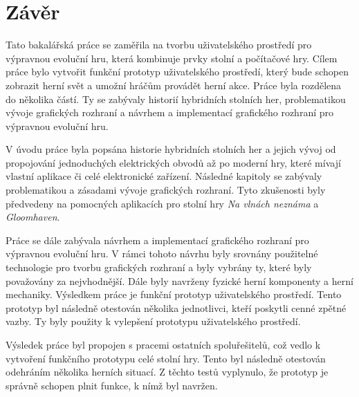 \chapter{Závěr}
Tato bakalářská práce se zaměřila na tvorbu uživatelského prostředí pro výpravnou evoluční hru, která kombinuje prvky stolní a počítačové hry. Cílem práce bylo vytvořit funkční prototyp uživatelského prostředí, který bude schopen zobrazit herní svět a umožní hráčům provádět herní akce. Práce byla rozdělena do několika částí. Ty se zabývaly historií hybridních stolních her, problematikou vývoje grafických rozhraní a návrhem a implementací grafického rozhraní pro výpravnou evoluční hru.

V úvodu práce byla popsána historie hybridních stolních her a jejich vývoj od propojování jednoduchých elektrických obvodů až po moderní hry, které mívají vlastní aplikace či celé elektronické zařízení. Následné kapitoly se zabývaly problematikou a zásadami vývoje grafických rozhraní. Tyto zkušenosti byly předvedeny na pomocných aplikacích pro stolní hry \textit{Na vlnách neznáma} a \textit{Gloomhaven}.

Práce se dále zabývala návrhem a implementací grafického rozhraní pro výpravnou evoluční hru. V rámci tohoto návrhu byly srovnány použitelné technologie pro tvorbu grafických rozhraní a byly vybrány ty, které byly považovány za nejvhodnější. Dále byly navrženy fyzické herní komponenty a herní mechaniky. Výsledkem práce je funkční prototyp uživatelského prostředí. Tento prototyp byl následně otestován několika jednotlivci, kteří poskytli cenné zpětné vazby. Ty byly použity k vylepšení prototypu uživatelského prostředí.

Výsledek práce byl propojen s pracemi ostatních spoluřešitelů, což vedlo k vytvoření funkčního prototypu celé stolní hry. Tento byl následně otestován odehráním několika herních situací. Z těchto testů vyplynulo, že prototyp je správně schopen plnit funkce, k nímž byl navržen.